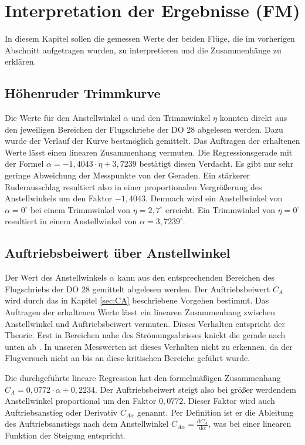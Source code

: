 \chapter{Interpretation der Ergebnisse (FM)}

In diesem Kapitel sollen die gemessen Werte der beiden Flüge, die im vorherigen Abschnitt aufgetragen wurden, zu interpretieren und die Zusammenhänge zu erklären. 

\section{Höhenruder Trimmkurve}
Die Werte für den Anstellwinkel $\alpha$ und den Trimmwinkel $\eta$ konnten direkt aus den jeweiligen Bereichen der Flugschriebe der DO 28 abgelesen werden. Dazu wurde der Verlauf der Kurve bestmöglich gemittelt. Das Auftragen der erhaltenen Werte lässt einen linearen Zusammenhang vermuten. Die Regressionsgerade mit der Formel $\alpha = -1,4043 \cdot \eta + 3,7239$ bestätigt diesen Verdacht. Es gibt nur sehr geringe Abweichung der Messpunkte von der Geraden. Ein stärkerer Ruderausschlag resultiert also in einer proportionalen Vergrößerung des Anstellwinkels um den Faktor $- 1,4043$.
Demnach wird ein Anstellwinkel von $\alpha = 0^{\circ}$ bei einem Trimmwinkel von $\eta = 2,7^{\circ}$ erreicht. Ein Trimmwinkel von $\eta = 0^{\circ}$ resultiert in einem Anstellwinkel von $\alpha = 3,7239^{\circ}$.

\section{Auftriebsbeiwert über Anstellwinkel}
Der Wert des Anstellwinkels $\alpha$ kann aus den entsprechenden Bereichen des Flugschriebs der DO 28 gemittelt abgelesen werden. Der Auftriebsbeiwert $C_A$ wird durch das in Kapitel \ref{sec:CA} beschriebene Vorgehen bestimmt. 
Das Auftragen der erhaltenen Werte lässt ein linearen Zusammenhang zwischen Anstellwinkel und Auftriebsbeiwert vermuten. Dieses Verhalten entspricht der Theorie. Erst in Bereichen nahe des Strömungsabrisses knickt die gerade nach unten ab \citep{Skript}. In unseren Messwerten ist dieses Verhalten nicht zu erkennen, da der Flugversuch nicht an bis an diese kritischen Bereiche geführt wurde.

Die durchgeführte lineare Regression hat den formelmäßigen Zusammenhang $C_A = 0,0772 \cdot \alpha + 0,2234$. Der Auftriebsbeiwert steigt also bei größer werdendem Anstellwinkel proportional um den Faktor $0,0772$. Dieser Faktor wird auch Auftriebsanstieg oder Derivativ $C_{A \alpha}$ genannt. Per Definition ist er die Ableitung des Auftriebsanstiegs nach dem Anstellwinkel $C_{A \alpha} = \frac{\mathrm{d} C_A}{\mathrm{d} \alpha}$, was bei einer linearen Funktion der Steigung entspricht. 

